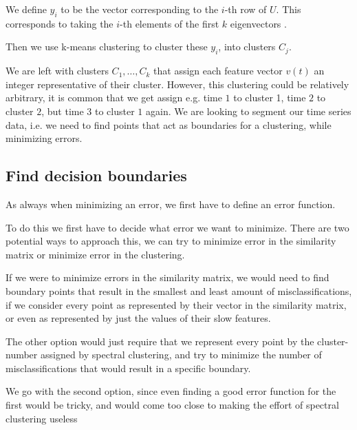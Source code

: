 We define $y_i$ to be the vector corresponding to the $i$-th row of $U$. This corresponds to taking the $i$-th elements of the first $k$ eigenvectors .

Then we use k-means clustering to cluster these  $y_i$, into clusters $C_j$.

We are left with clusters $C_1,\ldots, C_k$ that assign each feature vector $v(t)$ an integer representative of their cluster. However, this clustering could be relatively arbitrary, it is common that we get assign e.g. time $1$ to cluster 1, time $2$ to cluster $2$, but time $3$ to cluster $1$ again. We are looking to segment our time series data, i.e. we need to find points that act as boundaries for a clustering, while minimizing errors.
\subsection{Find decision boundaries}
As always when minimizing an error, we first have to define an error function. 

To do this we first have to decide what error we want to minimize. There are two potential ways to approach this, we can try to minimize error in the similarity matrix or minimize error in the clustering. 

If we were to minimize errors in the similarity matrix, we would need to find boundary points that result in the smallest and least amount of misclassifications, if we consider every point as represented by their vector in the similarity matrix, or even as represented by just the values of their slow features.

The other option would just require that we represent every point by the cluster-number assigned by spectral clustering, and try to minimize the number of misclassifications  that would result in a specific boundary. 

We go with the second option, since even finding a good error function for the first would be tricky, and would come too close to making the effort of spectral clustering useless  

